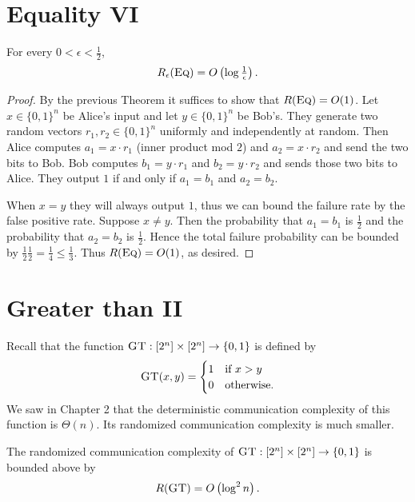 \newpage 
\section{Equality VI}


\begin{theorem}
For every $0 < \epsilon < \frac12$,
\[
R_\epsilon(\textsc{Eq}) = O\left(\log \tfrac1\epsilon \right).
\]
\end{theorem}

\begin{proof}
By the previous Theorem it suffices to show that $R(\textsc{Eq}) = O(1)$. Let $x \in \{0,1\}^n$ be Alice's input and let $y \in \{0,1\}^n$ be Bob's. They generate two random vectors $r_1, r_2  \in \{0,1\}^n$ uniformly and independently at random. Then Alice computes $a_1 = x\cdot r_1$ (inner product mod $2$) and $a_2 = x\cdot r_2$ and send the two bits to Bob. Bob computes $b_1 = y\cdot r_1$ and $b_2 = y \cdot r_2$ and sends those two bits to Alice. They output $1$ if and only if $a_1 = b_1$ and $a_2 = b_2$.

When $x = y$ they will always output $1$, thus we can bound the failure rate by the false positive rate. Suppose $x \neq y$. Then the probability that $a_1 = b_1$ is $\frac{1}{2}$ and the probability that $a_2 = b_2$ is $\frac{1}{2}$. Hence the total failure probability can be bounded by  $\frac{1}{2}\frac{1}{2} = \frac{1}{4} \leq \frac{1}{3}$. Thus $R(\textsc{Eq}) = O(1)$, as desired.
\end{proof}


\newpage 
\section{Greater than II}

Recall that the function $\textsc{GT} : [2^n] \times [2^n] \to \{0,1\}$ is defined by
\[
\textsc{GT}(x,y) = \begin{cases}
1 & \mbox{if } x > y \\
0 & \mbox{otherwise.}
\end{cases}
\]
We saw in Chapter 2 that the deterministic communication complexity of this function is $\Theta(n)$. Its randomized communication complexity is much smaller.

\begin{theorem}
The randomized communication complexity of $\textsc{GT} : [2^n] \times [2^n] \to \{0,1\}$ is bounded above by
\[
R(\textsc{GT}) = O\left(\log^2 n \right).
\]
\end{theorem}

